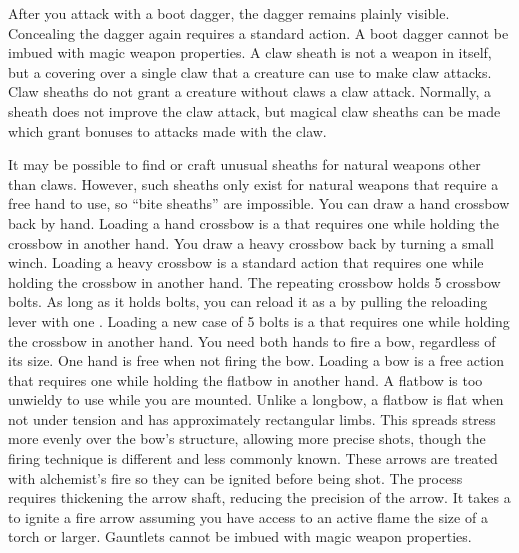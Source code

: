         After you attack with a boot dagger, the dagger remains plainly visible.
        Concealing the dagger again requires a standard action.
        A boot dagger cannot be imbued with magic weapon properties.
         A claw sheath is not a weapon in itself, but a covering over a single claw that a creature can use to make claw attacks. Claw sheaths do not grant a creature without claws a claw attack. Normally, a sheath does not improve the claw attack, but magical claw sheaths can be made which grant bonuses to attacks made with the claw.

        It may be possible to find or craft unusual sheaths for natural weapons other than claws.
        However, such sheaths only exist for natural weapons that require a free hand to use, so ``bite sheaths'' are impossible.
         You can draw a hand crossbow back by hand. Loading a hand crossbow is a  that requires one  while holding the crossbow in another hand.
         You draw a heavy crossbow back by turning a small winch.
        Loading a heavy crossbow is a standard action that requires one  while holding the crossbow in another hand.
         The repeating crossbow holds 5 crossbow bolts. As long as it holds bolts, you can reload it as a  by pulling the reloading lever with one . Loading a new case of 5 bolts is a  that requires one  while holding the crossbow in another hand.
         You need both hands to fire a bow, regardless of its size. One hand is free when not firing the bow. Loading a bow is a free action that requires one  while holding the flatbow in another hand. A flatbow is too unwieldy to use while you are mounted.
        Unlike a longbow, a flatbow is flat when not under tension and has approximately rectangular limbs.
        This spreads stress more evenly over the bow's structure, allowing more precise shots, though the firing technique is different and less commonly known.
         These arrows are treated with alchemist's fire so they can be ignited before being shot.
        The process requires thickening the arrow shaft, reducing the precision of the arrow.
        It takes a  to ignite a fire arrow assuming you have access to an active flame the size of a torch or larger.
         Gauntlets cannot be imbued with magic weapon properties.
